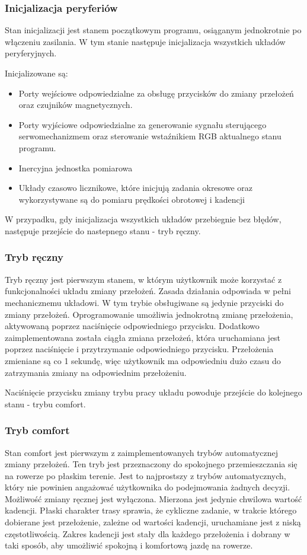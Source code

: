 \subsubsection{Inicjalizacja peryferiów}
Stan inicjalizacji jest stanem początkowym programu, osiąganym jednokrotnie po włączeniu zasilania. W tym stanie następuje inicjalizacja wszystkich układów peryferyjnych. 

Inicjalizowane są:
\begin{itemize}
\item
Porty wejściowe odpowiedzialne za obsługę przycisków do zmiany przełożeń oraz czujników magnetycznych.
\item
Porty wyjściowe odpowiedzialne za generowanie sygnału sterującego serwomechanizmem oraz sterowanie wstaźnikiem RGB aktualnego stanu programu. 
\item
Inercyjna jednostka pomiarowa
\item
Układy czasowo licznikowe, które inicjują zadania okresowe oraz wykorzystywane są do pomiaru prędkości obrotowej i kadencji
\end{itemize}

W przypadku, gdy inicjalizacja wszystkich układów przebiegnie bez błędów, następuje przejście do nastepnego stanu - tryb ręczny.
\subsubsection{Tryb ręczny}
Tryb ręczny jest pierwszym stanem, w którym użytkownik może korzystać z funkcjonalności układu zmiany przełożeń. Zasada działania odpowiada w pełni mechanicznemu układowi. W tym trybie obsługiwane są jedynie przyciski do zmiany przełożeń. Oprogramowanie umożliwia jednokrotną zmianę przełożenia, aktywowaną poprzez naciśnięcie odpowiedniego przycisku. Dodatkowo zaimplementowana została ciągła zmiana przełożeń, która uruchamiana jest poprzez naciśnięcie i przytrzymanie odpowiedniego przycisku. Przełożenia zmieniane są co 1 sekundę, więc użytkownik ma odpowiedniu dużo czasu do zatrzymania zmiany na odpowiednim przełożeniu.

Naciśnięcie przycisku zmiany trybu pracy układu powoduje przejście do kolejnego stanu - trybu comfort.

\subsubsection{Tryb comfort}
Stan comfort jest pierwszym z zaimplementowanych trybów automatycznej zmiany przełożeń. Ten tryb jest przeznaczony do spokojnego przemieszczania się na rowerze po płaskim terenie. Jest to najprostszy z trybów automatycznych, który nie powinien angażować użytkownika do podejmowania żadnych decyzji. Możliwość zmiany ręcznej jest wyłączona. Mierzona jest jedynie chwilowa wartość kadencji. Płaski charakter trasy sprawia, że cykliczne zadanie, w trakcie którego dobierane jest przełożenie, zależne od wartości kadencji, uruchamiane jest z niską częstotliwością. Zakres kadencji jest stały dla każdego przełożenia i dobrany w taki sposób, aby umożliwić spokojną i komfortową jazdę na rowerze.  

